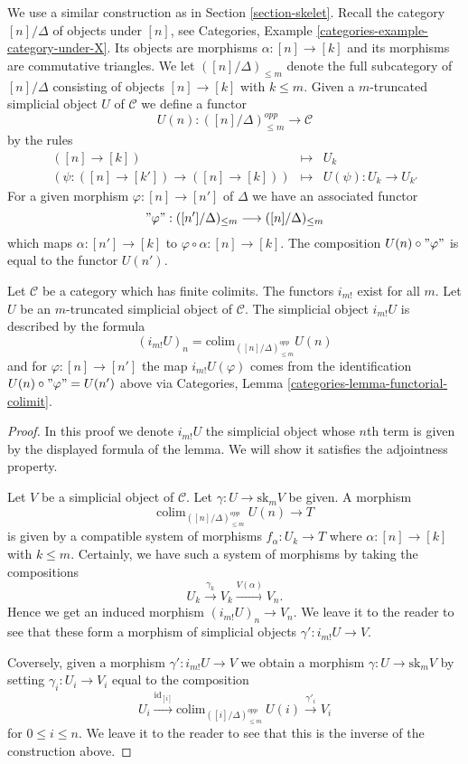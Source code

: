 \medskip\noindent
We use a similar construction as in Section \ref{section-skelet}.
Recall the category $[n]/\Delta$ of objects
under $[n]$, see
Categories, Example \ref{categories-example-category-under-X}.
Its objects are morphisms $\alpha : [n] \to [k]$
and its morphisms are commutative triangles.
We let $([n]/\Delta)_{\leq m}$ denote the full subcategory
of $[n]/\Delta$ consisting of objects $[n] \to [k]$
with $k \leq m$. Given a $m$-truncated
simplicial object $U$ of $\mathcal{C}$
we define a functor
$$
U(n) : ([n]/\Delta)_{\leq m}^{opp} \longrightarrow \mathcal{C}
$$
by the rules
\begin{eqnarray*}
([n] \to [k]) & \longmapsto & U_k \\
(\psi : ([n] \to [k']) \to ([n] \to [k]))
& \longmapsto &
U(\psi) : U_k \to U_{k'}
\end{eqnarray*}
For a given morphism $\varphi : [n] \to [n']$ of $\Delta$
we have an associated functor
$$
"\varphi" : ([n']/\Delta)_{\leq m} \longrightarrow ([n]/\Delta)_{\leq m}
$$
which maps $\alpha : [n'] \to [k]$ to
$\varphi \circ \alpha : [n] \to [k]$.
The composition $U(n) \circ "\varphi"$ is
equal to the functor $U(n')$.

\begin{lemma}
\label{lemma-left-adjoint-exists}
Let $\mathcal{C}$ be a category which has finite colimits.
The functors $i_{m!}$ exist for all $m$.
Let $U$ be an $m$-truncated simplicial object of $\mathcal{C}$.
The simplicial object $i_{m!}U$
is described by the formula
$$
(i_{m!}U)_n = \text{colim}_{([n]/\Delta)_{\leq m}^{opp}} U(n)
$$
and for $\varphi : [n] \to [n']$ the map
$i_{m!}U(\varphi)$ comes from the
identification $U(n) \circ "\varphi" = U(n')$ above
via Categories, Lemma \ref{categories-lemma-functorial-colimit}.
\end{lemma}

\begin{proof}
In this proof we denote $i_{m!}U$ the simplicial object
whose $n$th term is given by the displayed formula of the
lemma. We will show it satisfies the adjointness property.

\medskip\noindent
Let $V$ be a simplicial object of $\mathcal{C}$.
Let $\gamma : U \to \text{sk}_mV$ be given.
A morphism
$$
\text{colim}_{([n]/\Delta)_{\leq m}^{opp}}\ U(n) \to T
$$
is given by a compatible system of morphisms
$f_\alpha : U_k \to T$ where $\alpha : [n] \to [k]$
with $k \leq m$. Certainly, we have such a system of
morphisms by taking the compositions
$$
U_k \xrightarrow{\gamma_k} V_k \xrightarrow{V(\alpha)} V_n.
$$
Hence we get an induced morphism $(i_{m!}U)_n \to V_n$.
We leave it to the reader to see that these form a
morphism of simplicial objects $\gamma' : i_{m!}U \to V$.

\medskip\noindent
Coversely, given a morphism $\gamma' : i_{m!}U \to V$ we obtain
a morphism $\gamma : U \to \text{sk}_m V$ by setting
$\gamma_i : U_i \to V_i$ equal to the composition
$$
U_i
\xrightarrow{\text{id}_{[i]}}
\text{colim}_{([i]/\Delta)_{\leq m}^{opp}}\ U(i)
\xrightarrow{\gamma'_i}
V_i
$$
for $0 \leq i \leq n$. We leave it to the reader to see that
this is the inverse of the construction above.
\end{proof}

